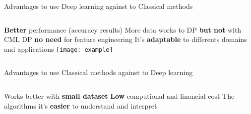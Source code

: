 \begin{frame}[t]{Advantages to use Deep learning against to Classical methods} 
        \begin{columns}[c]
                \newline
                \newline
                \textbf{Better} performance (accuracy results)
                \newline
                \newline
                More data works to DP \textbf{but not} with CML
                \newline
                \newline
                DP \textbf{no need} for feature engineering
                \newline
                \newline
                It's \textbf{adaptable} to differents domains and applications
                \newline
                \newline
                        \texttt{[image: example]}
        \end{columns}
       
\end{frame}


\begin{frame}[t]{Advantages to use Classical methods against to  Deep learning} 
        \begin{columns}[c]
                \newline
                \newline
                Works better with \textbf{small dataset}
                \newline
                \newline
                \textbf{Low} computional and financial cost
                \newline
                \newline
                The algorithms it's \textbf{easier} to understand and interpret
                \newline
                \newline
        \end{columns}
       
\end{frame}